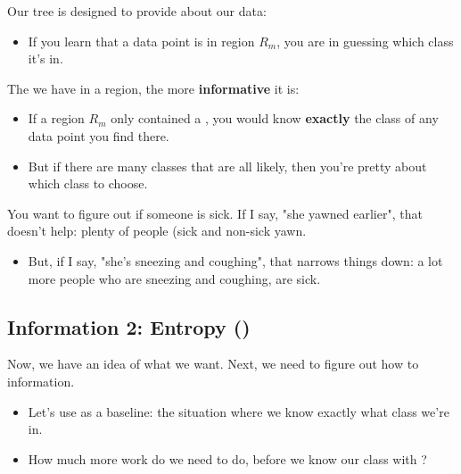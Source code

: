         \begin{concept}
            Our tree is designed to provide  about our data:

            \begin{itemize}
                \item If you learn that a data point is in region $R_m$, you are  in guessing which class it's in.
            \end{itemize}

            The  we have in a region, the more \textbf{informative} it is: 

            \begin{itemize}
                \item If a region $R_m$ only contained a , you would know \textbf{exactly} the class of any data point you find there.
                \item But if there are many classes that are all likely, then you're pretty  about which class to choose.
            \end{itemize}
        \end{concept}

        \miniex You want to figure out if someone is sick. If I say, "she yawned earlier", that doesn't help: plenty of people (sick and non-sick yawn.

        \begin{itemize}
            \item But, if I say, "she's sneezing and coughing", that narrows things down: a lot more people who are sneezing and coughing, are sick.
        \end{itemize}

    \phantom{}

    \subsection{Information 2: Entropy ()}

        Now, we have an idea of what we want. Next, we need to figure out how to  information.

        \begin{itemize}
            \item Let's use  as a baseline: the situation where we know exactly what class we're in.

            \item How much more work do we need to do, before we know our class with ?\\
        \end{itemize}

